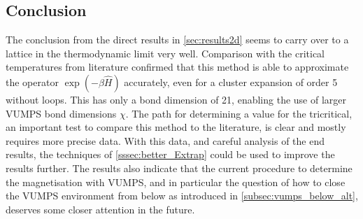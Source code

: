 \subsection{Conclusion}

The conclusion from the direct results in \cref{sec:results2d} seems to carry over to a lattice in the thermodynamic limit very well. Comparison with the critical temperatures from literature confirmed that this method is able to approximate the operator $\exp(-\beta \hat{H})$ accurately, even for a cluster expansion of order 5 without loops. This has only a bond dimension of 21, enabling the use of larger \Gls{VUMPS} bond dimensions $\chi$.
The path for determining a value for the tricritical, an important test  to compare this method to the literature, is clear and mostly requires more precise data. With this data, and careful analysis of the end results, the techniques of \cref{sssec:better_Extrap} could be used to improve  the results further. The results also indicate that the current procedure to determine the magnetisation with \Gls{VUMPS}, and in particular the question of how to close the \Gls{VUMPS} environment from below as introduced in \cref{subsec:vumps_below_alt}, deserves some closer attention in the future.